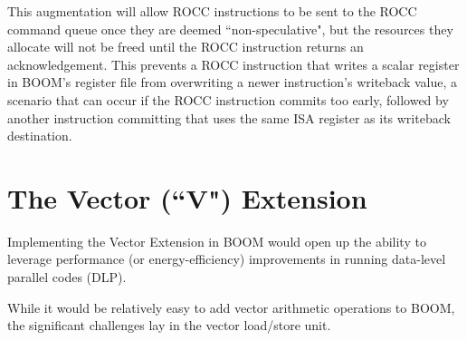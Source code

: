 This augmentation will allow ROCC instructions to be sent to the ROCC command queue once they are deemed ``non-speculative", but the resources they allocate will not be freed until the ROCC instruction returns an acknowledgement.  This prevents a ROCC instruction that writes a scalar register in BOOM's register file from overwriting a newer instruction's writeback value, a scenario that can occur if the ROCC instruction commits too early, followed by another instruction committing that uses the same ISA register as its writeback destination. 



\section{The Vector (``V") Extension}

Implementing the Vector Extension in BOOM would open up the ability to leverage performance (or energy-efficiency) improvements in running data-level parallel codes (DLP). 

While it would be relatively easy to add vector arithmetic operations to BOOM, the significant challenges lay in the vector load/store unit. 

